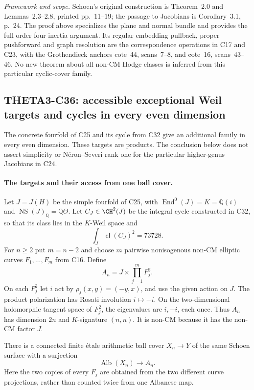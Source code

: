 \documentclass[11pt]{article}
\newcommand{\Q}{\mathbb Q}\newcommand{\C}{\mathbb C}\newcommand{\Z}{\mathbb Z}\newcommand{\R}{\mathbb R}\newcommand{\A}{\mathbb A}\newcommand{\OO}{\mathcal O}
\newcommand{\framework}[1]{\par\smallskip\noindent\textit{Framework and scope.} #1\par}
\theoremstyle{definition}\newtheorem{definition}[theorem]{Definition}\newtheorem{remark}[theorem]{Remark}
\begin{document}
\framework{Schoen's original construction is
Theorem~2.0 and Lemmas~2.3--2.8, printed
pp.~11--19; the passage to Jacobians is
Corollary~3.1, p.~24.  The proof above
specializes the plane and normal bundle
and provides the full order-four inertia
argument.  Its regular-embedding pullback,
proper pushforward and graph resolution
are the correspondence operations in
C17 and C23, with the Grothendieck
anchors cote~44, scans~7--8, and
cote~16, scans~43--46.  No new theorem
about all non-CM Hodge classes is inferred
from this particular cyclic-cover family.}


\subsection{THETA3-C36: accessible exceptional Weil targets and cycles in every even dimension}\label{C36}

The concrete fourfold of C25 and its cycle from C32 give an
additional family in every even dimension. These targets are
products. The conclusion below does not assert simplicity or
N\'eron--Severi rank one for the particular higher-genus
Jacobians in C24.

\paragraph{The targets and their access from one ball cover.}
Let $J=J(H)$ be the simple fourfold of C25, with
$\operatorname{End}^0(J)=K=\Q(i)$ and
$\operatorname{NS}(J)_\Q=\Q\Theta$. Let
$C_J\in\CH^2(J)$ be the integral cycle constructed in
C32, so that its class lies in the $K$-Weil space and
\[
                 \int_J\operatorname{cl}(C_J)^2=73728.
 \tag{C36a}
\]
For $n\ge2$ put $m=n-2$ and choose $m$ pairwise
nonisogenous non-CM elliptic curves $F_1,\ldots,F_m$
from C16. Define
\[
                  A_n=J\times\prod_{j=1}^m F_j^2.
 \tag{C36b}
\]
On each $F_j^2$ let $i$ act by
$\rho_j(x,y)=(-y,x)$, and use the given action on $J$.
The product polarization has Rosati involution
$i\mapsto-i$. On the two-dimensional holomorphic tangent
space of $F_j^2$, the eigenvalues are $i,-i$, each once.
Thus $A_n$ has dimension $2n$ and $K$-signature $(n,n)$.
It is non-CM because it has the non-CM factor $J$.

There is a connected finite \'etale arithmetic ball cover
$X_n\to Y$ of the same Schoen surface with a surjection
\[
                    \operatorname{Alb}(X_n)
                               \longrightarrow A_n.
 \tag{C36c}
\]
Here the two copies of every $F_j$ are obtained from the
two different curve projections, rather than counted
twice from one Albanese map.
\end{document}
